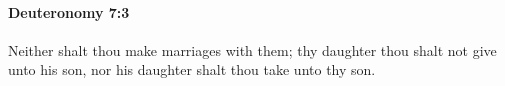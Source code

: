 
		\paragraph{Deuteronomy 7:3} %
			\label{DEUTERONOMY-7-3}

			Neither shalt thou make marriages with them; thy daughter thou shalt not give unto his son, nor his daughter shalt thou take unto thy son.


